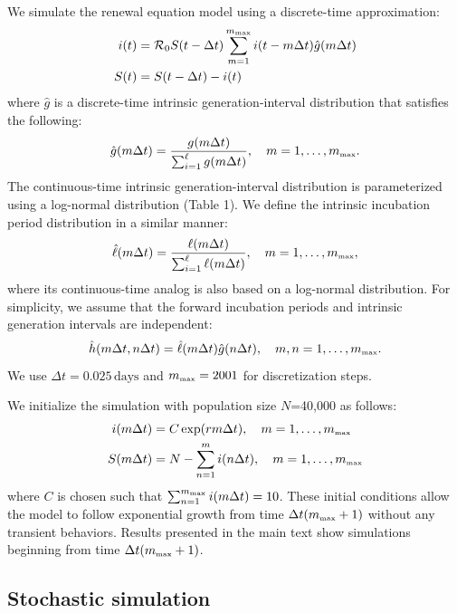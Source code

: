 \documentclass[12pt]{article}
\newcommand{\Rx}[1]{\ensuremath{{\mathcal R}_{#1}}\xspace}
\newcommand{\Ro}{\Rx{0}}
\newcommand{\tsub}[2]{#1_{{\textrm{\tiny #2}}}}
\newcommand{\gdist}{g} %
\newcommand{\idist}{\ell} %
\begin{document}
We simulate the renewal equation model using a discrete-time approximation:
\begin{align}
i(t) &= \Ro S(t-\Delta t) \sum_{m=1}^{\tsub{m}{max}} i(t-m \Delta t) \hat{\gdist}(m \Delta t) \nonumber \\
S(t) &= S(t-\Delta t) - i(t)
\end{align}
where $\hat{\gdist}$ is a discrete-time intrinsic generation-interval distribution that satisfies the following:
\begin{equation}
\hat{\gdist}(m \Delta t) = \frac{\gdist(m \Delta t)}{\sum_{i=1}^\ell \gdist(m \Delta t)}, \quad m=1, \dots, \tsub{m}{max}.
\end{equation}
The continuous-time intrinsic generation-interval distribution is parameterized using a log-normal distribution (Table 1). We define the intrinsic incubation period distribution in a similar manner:
\begin{equation}
\hat{\idist}(m \Delta t) = \frac{\idist(m \Delta t)}{\sum_{i=1}^\ell \idist(m \Delta t)}, \quad m=1, \dots, \tsub{m}{max},
\end{equation}
where its continuous-time analog is also based on a log-normal distribution.
For simplicity, we assume that the forward incubation periods and intrinsic generation intervals are independent:
\begin{equation}
\hat{h}(m \Delta t, n \Delta t) = \hat{\idist}(m \Delta t)\hat{\gdist}(n \Delta t), \quad m,n=1, \dots, \tsub{m}{max}.
\end{equation}
We use $\Delta t = 0.025\,\textrm{days}$ and $\tsub{m}{max}=2001$ for discretization steps.

We initialize the simulation with population size $N$=40,000 as follows:
\begin{align}
i(m \Delta t) &= C \exp(r m \Delta t), \quad m=1, \dots, \tsub{m}{max}\nonumber \\
S(m \Delta t) &= N - \sum_{n=1}^m i(n \Delta t), \quad m=1, \dots, \tsub{m}{max}
\end{align}
where $C$ is chosen such that $\sum_{n=1}^{\tsub{m}{max}} i(m \Delta t)=10$.
These initial conditions allow the model to follow exponential growth from time $\Delta t (\tsub{m}{max} + 1)$ without any transient behaviors.
Results presented in the main text show simulations beginning from time $\Delta t (\tsub{m}{max} + 1)$.

\subsection{Stochastic simulation}
\end{document}
